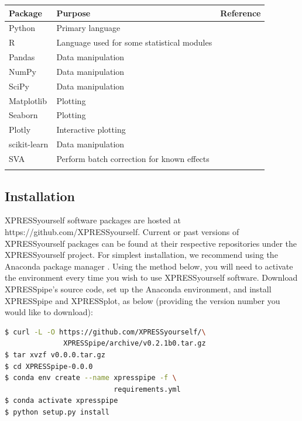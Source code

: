 \documentclass[10pt, oneside]{article}
\begin{document}
\begin{multicols}{2}
\begin{table}[!]
    \centering
{}
\begin{tabular}{p{2.4cm}p{7.5cm}p{3cm}}
 \textbf{Package} & \textbf{Purpose} & \textbf{Reference} \\
 \hline
 Python & Primary language & \\
 \hline
 R & Language used for some statistical modules & \\
 \hline
 Pandas & Data manipulation & \cite{pandas} \\
 \hline
 NumPy & Data manipulation & \cite{numpy1, numpy2} \\
 \hline
 SciPy & Data manipulation & \cite{scipy} \\
 \hline
 Matplotlib & Plotting & \cite{matplotlib} \\
 \hline
 Seaborn & Plotting & \cite{seaborn} \\
 \hline
 Plotly & Interactive plotting & \cite{plotly} \\
 \hline
 scikit-learn & Data manipulation & \cite{sklearn} \\
 \hline
 SVA & Perform batch correction for known effects & \cite{sva} \\
 \label{Tab:software_plot}
 \end{tabular}
\end{table}

\subsection*{Installation}
XPRESSyourself software packages are hosted at https://github.com/XPRESSyourself. Current or past versions of XPRESSyourself packages can be found at their respective repositories under the XPRESSyourself project. For simplest installation, we recommend using the Anaconda package manager \cite{anaconda}. Using the method below, you will need to activate the environment every time you wish to use XPRESSyourself software. Download XPRESSpipe's source code, set up the Anaconda environment, and install XPRESSpipe and XPRESSplot, as below (providing the version number you would like to download):

\begin{lstlisting}[language=bash, caption=XPRESSyourself installation]
$ curl -L -O https://github.com/XPRESSyourself/\
              XPRESSpipe/archive/v0.2.1b0.tar.gz
$ tar xvzf v0.0.0.tar.gz
$ cd XPRESSpipe-0.0.0
$ conda env create --name xpresspipe -f \
                          requirements.yml
$ conda activate xpresspipe
$ python setup.py install
\end{lstlisting}


\end{multicols}
\end{document}
